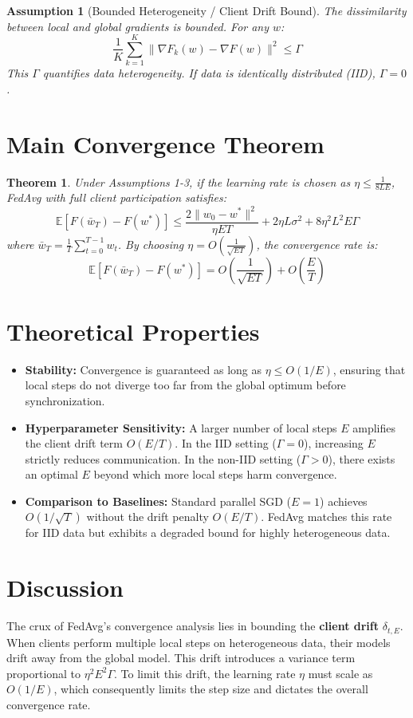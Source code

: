 \documentclass{article}
\newtheorem{theorem}{Theorem}
\newtheorem{assumption}{Assumption}
\begin{document}
\begin{assumption}[Bounded Heterogeneity / Client Drift Bound]
The dissimilarity between local and global gradients is bounded. For any $w$:
$$ \frac{1}{K}\sum_{k=1}^K \|\nabla F_k(w) - \nabla F(w)\|^2 \leq \Gamma $$
This $\Gamma$ quantifies data heterogeneity. If data is identically distributed (IID), $\Gamma = 0$.
\end{assumption}

\section*{Main Convergence Theorem}
\begin{theorem}
Under Assumptions 1-3, if the learning rate is chosen as $\eta \leq \frac{1}{8LE}$, FedAvg with full client participation satisfies:
$$ \mathbb{E}[F(\bar{w}_T) - F(w^*)] \leq \frac{2\|w_0 - w^*\|^2}{\eta ET} + 2\eta L \sigma^2 + 8\eta^2 L^2 E \Gamma $$
where $\bar{w}_T = \frac{1}{T}\sum_{t=0}^{T-1} w_t$. By choosing $\eta = O\left(\frac{1}{\sqrt{ET}}\right)$, the convergence rate is:
$$ \mathbb{E}[F(\bar{w}_T) - F(w^*)] = O\left(\frac{1}{\sqrt{ET}}\right) + O\left(\frac{E}{T}\right) $$
\end{theorem}

\section*{Theoretical Properties}
\begin{itemize}
    \item \textbf{Stability:} Convergence is guaranteed as long as $\eta \leq O(1/E)$, ensuring that local steps do not diverge too far from the global optimum before synchronization.
    \item \textbf{Hyperparameter Sensitivity:} A larger number of local steps $E$ amplifies the client drift term $O(E/T)$. In the IID setting ($\Gamma=0$), increasing $E$ strictly reduces communication. In the non-IID setting ($\Gamma>0$), there exists an optimal $E$ beyond which more local steps harm convergence.
    \item \textbf{Comparison to Baselines:} Standard parallel SGD ($E=1$) achieves $O(1/\sqrt{T})$ without the drift penalty $O(E/T)$. FedAvg matches this rate for IID data but exhibits a degraded bound for highly heterogeneous data.
\end{itemize}

\section*{Discussion}
The crux of FedAvg's convergence analysis lies in bounding the \textbf{client drift} $\delta_{t,E}$. When clients perform multiple local steps on heterogeneous data, their models drift away from the global model. This drift introduces a variance term proportional to $\eta^2 E^2 \Gamma$. To limit this drift, the learning rate $\eta$ must scale as $O(1/E)$, which consequently limits the step size and dictates the overall convergence rate.
\end{document}
